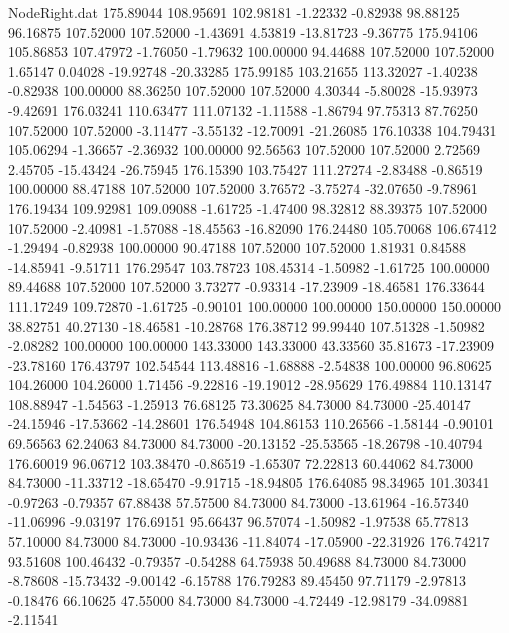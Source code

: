 \begin{filecontents}{NodeRight.dat}
 175.89044  108.95691  102.98181    -1.22332   -0.82938   98.88125   96.16875  107.52000  107.52000   -1.43691    4.53819  -13.81723   -9.36775
 175.94106  105.86853  107.47972    -1.76050   -1.79632  100.00000   94.44688  107.52000  107.52000    1.65147    0.04028  -19.92748  -20.33285
 175.99185  103.21655  113.32027    -1.40238   -0.82938  100.00000   88.36250  107.52000  107.52000    4.30344   -5.80028  -15.93973   -9.42691
 176.03241  110.63477  111.07132    -1.11588   -1.86794   97.75313   87.76250  107.52000  107.52000   -3.11477   -3.55132  -12.70091  -21.26085
 176.10338  104.79431  105.06294    -1.36657   -2.36932  100.00000   92.56563  107.52000  107.52000    2.72569    2.45705  -15.43424  -26.75945
 176.15390  103.75427  111.27274    -2.83488   -0.86519  100.00000   88.47188  107.52000  107.52000    3.76572   -3.75274  -32.07650   -9.78961
 176.19434  109.92981  109.09088    -1.61725   -1.47400   98.32812   88.39375  107.52000  107.52000   -2.40981   -1.57088  -18.45563  -16.82090
 176.24480  105.70068  106.67412    -1.29494   -0.82938  100.00000   90.47188  107.52000  107.52000    1.81931    0.84588  -14.85941   -9.51711
 176.29547  103.78723  108.45314    -1.50982   -1.61725  100.00000   89.44688  107.52000  107.52000    3.73277   -0.93314  -17.23909  -18.46581
 176.33644  111.17249  109.72870    -1.61725   -0.90101  100.00000  100.00000  150.00000  150.00000   38.82751   40.27130  -18.46581  -10.28768
 176.38712   99.99440  107.51328    -1.50982   -2.08282  100.00000  100.00000  143.33000  143.33000   43.33560   35.81673  -17.23909  -23.78160
 176.43797  102.54544  113.48816    -1.68888   -2.54838  100.00000   96.80625  104.26000  104.26000    1.71456   -9.22816  -19.19012  -28.95629
 176.49884  110.13147  108.88947    -1.54563   -1.25913   76.68125   73.30625   84.73000   84.73000  -25.40147  -24.15946  -17.53662  -14.28601
 176.54948  104.86153  110.26566    -1.58144   -0.90101   69.56563   62.24063   84.73000   84.73000  -20.13152  -25.53565  -18.26798  -10.40794
 176.60019   96.06712  103.38470    -0.86519   -1.65307   72.22813   60.44062   84.73000   84.73000  -11.33712  -18.65470   -9.91715  -18.94805
 176.64085   98.34965  101.30341    -0.97263   -0.79357   67.88438   57.57500   84.73000   84.73000  -13.61964  -16.57340  -11.06996   -9.03197
 176.69151   95.66437   96.57074    -1.50982   -1.97538   65.77813   57.10000   84.73000   84.73000  -10.93436  -11.84074  -17.05900  -22.31926
 176.74217   93.51608  100.46432    -0.79357   -0.54288   64.75938   50.49688   84.73000   84.73000   -8.78608  -15.73432   -9.00142   -6.15788
 176.79283   89.45450   97.71179    -2.97813   -0.18476   66.10625   47.55000   84.73000   84.73000   -4.72449  -12.98179  -34.09881   -2.11541

\end{filecontents}
